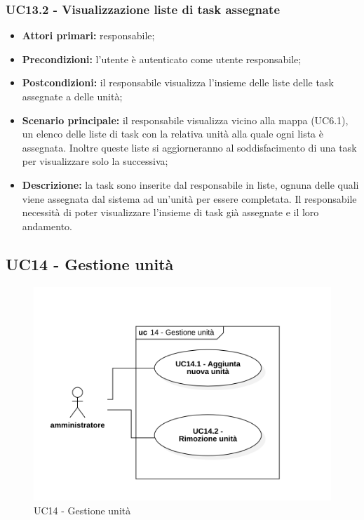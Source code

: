 \subsubsection{UC13.2 - Visualizzazione liste di task assegnate}
\begin{itemize}
	\item 	\textbf{Attori primari:} responsabile;
	\item 	\textbf{Precondizioni:} l'utente è autenticato come utente responsabile;
	\item 	\textbf{Postcondizioni:} il responsabile visualizza l'insieme delle liste delle task assegnate a delle unità;
	\item 	\textbf{Scenario principale:} il responsabile visualizza vicino alla mappa (UC6.1), un elenco delle liste di task con la relativa unità alla quale ogni lista è assegnata. Inoltre queste liste si aggiorneranno al soddisfacimento di una task per visualizzare solo la successiva;
	\item 	\textbf{Descrizione:} la task sono inserite dal responsabile in liste, ognuna delle quali viene assegnata dal sistema ad un'unità per essere completata. Il responsabile necessità di poter visualizzare l'insieme di task già assegnate e il loro andamento.

\end{itemize}

\subsection{UC14 - Gestione unità}

\begin{figure}[H]
	\centering
	\includegraphics[scale=0.52]{res/images/uc14.png}
	\caption{UC14 - Gestione unità}
\end{figure}

